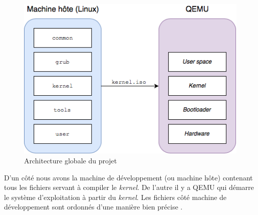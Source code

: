 \begin{figure}[!h]
    \centering
    \includegraphics[scale=0.65]{images/global_arch.png}
    \caption{Architecture globale du projet}
    \label{global_arch}
\end{figure}

D'un côté nous avons la machine de développement (ou machine hôte) contenant tous
les fichiers servant à compiler le \textit{kernel}. De l'autre il y a QEMU qui
démarre le système d'exploitation à partir du \textit{kernel}. Les fichiers côté
machine de développement sont ordonnés d'une manière bien précise \cite{ref42}.

\begin{center}
    \label{tab:project_struct}
\end{center}